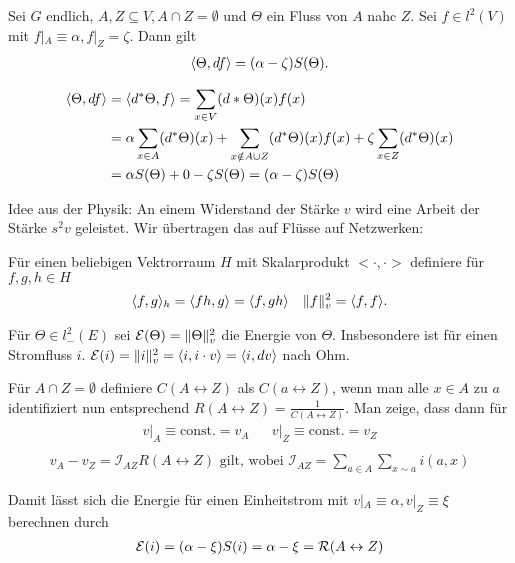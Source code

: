 \begin{lemma}
	Sei $G$ endlich, $A,Z \subseteq V, A\cap Z = \emptyset$ und $\Theta$ ein Fluss von $A$ nahc $Z$. Sei $f \in l^2(V)$ mit $f|_A \equiv \alpha, f|_Z = \zeta$. Dann gilt
	\begin{gather}
		\langle\Theta,df\rangle = (\alpha - \zeta) S(\Theta).
	\end{gather}
\end{lemma}
\begin{beweis}
	\begin{align}
		\langle\Theta,df\rangle &= \langle d^*\Theta,f\rangle = \sum\limits_{x \in V} (d*\Theta)(x)f(x) \\
			&= \alpha\sum\limits_{x\in A} (d^* \Theta)(x) + \sum\limits_{x \notin A \cup Z} (d^*\Theta)(x)f(x) + \zeta\sum\limits_{x\in Z} (d^*\Theta)(x) \\
			&= \alpha S(\Theta) + 0 - \zeta S(\Theta)  = (\alpha - \zeta) S(\Theta)
	\end{align}
\end{beweis}
Idee aus der Physik: An einem Widerstand der Stärke $v$ wird eine Arbeit der Stärke $s^2v$ geleistet. Wir übertragen das auf Flüsse auf Netzwerken:
\begin{definition}
	Für einen beliebigen Vektrorraum $H$ mit Skalarprodukt $<\cdot,\cdot>$ definiere für $f,g,h \in H$
	\begin{align}
		\langle f,g\rangle_h = \langle fh,g\rangle = \langle f,gh\rangle && \lVert f\rVert^2_v = \langle f,f\rangle.
	\end{align}
\end{definition}
Für $\Theta \in l^2_-(E)$ sei $\mathcal{E}(\Theta) = \lVert\Theta\rVert^2_v$ die Energie von $\Theta$. Insbesondere ist für einen Stromfluss $i$. $\mathcal{E}(i) = \lVert i\rVert^2_v = \langle i,i\cdot v\rangle  =\langle i, dv\rangle$ nach Ohm.

\begin{uebung}
	Für $A\cap Z = \emptyset$ definiere $C(A \leftrightarrow Z)$ als $C(a \leftrightarrow Z)$, wenn man alle $x \in A$ zu $a$ identifiziert nun entsprechend $R(A \leftrightarrow Z) = \frac{1}{C(A \leftrightarrow Z)}$. Man zeige, dass dann für
	\begin{align} 
		v|_A \equiv \text{const.} = v_A && v|_Z \equiv \text{const.} = v_Z \\ 
	\end{align}
	\begin{align}
		v_A - v_Z = \mathcal{I}_{AZ}R(A \leftrightarrow Z) \text{ gilt, wobei } \mathcal{I}_{AZ} = \sum\limits_{a \in A}\sum\limits_{x \sim a}i(a,x)
	\end{align}
	
	Damit lässt sich die Energie für einen Einheitstrom mit $v|_A \equiv \alpha, v|_Z \equiv \xi$ berechnen durch 
	\begin{align}
		\mathcal{E}(i) = \enb{\alpha - \xi} S(i) = \alpha - \xi = \mathcal{R}(A \leftrightarrow Z)
	\end{align}
\end{uebung}

